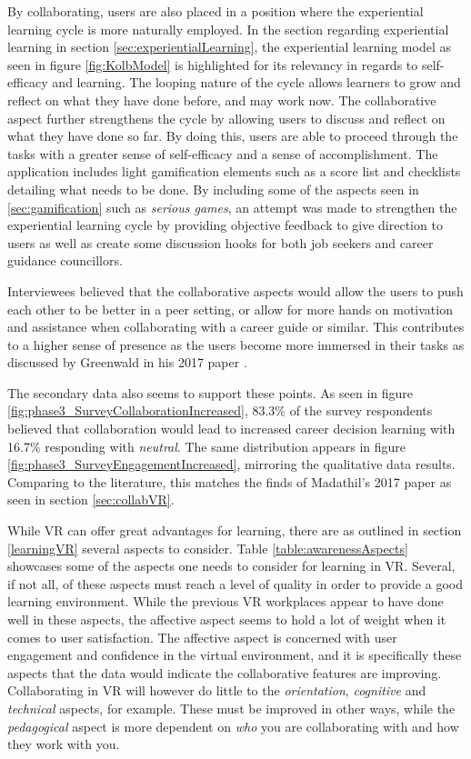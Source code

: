 By collaborating, users are also placed in a position where the experiential learning cycle is more naturally employed. In the section regarding experiential learning in section \ref{sec:experientialLearning}, the experiential learning model as seen in figure \ref{fig:KolbModel} is highlighted for its relevancy in regards to self-efficacy and learning. The looping nature of the cycle allows learners to grow and reflect on what they have done before, and may work now. The collaborative aspect further strengthens the cycle by allowing users to discuss and reflect on what they have done so far.  By doing this, users are able to proceed through the tasks with a greater sense of self-efficacy and a sense of accomplishment. The application includes light gamification elements such as a score list and checklists detailing what needs to be done. By including some of the aspects seen in \ref{sec:gamification} such as \textit{serious games}, an attempt was made to strengthen the experiential learning cycle by providing objective feedback to give direction to users as well as create some discussion hooks for both job seekers and career guidance councillors.

Interviewees believed that the collaborative aspects would allow the users to push each other to be better in a peer setting, or allow for more hands on motivation and assistance when collaborating with a career guide or similar. This contributes to a higher sense of presence as the users become more immersed in their tasks as discussed by Greenwald in his 2017 paper \cite{greenwald2017technology}.


The secondary data also seems to support these points. As seen in figure \ref{fig:phase3_SurveyCollaborationIncreased}, 83.3\% of the survey respondents believed that collaboration would lead to increased career decision learning with 16.7\% responding with \textit{neutral}. The same distribution appears in figure \ref{fig:phase3_SurveyEngagementIncreased}, mirroring the qualitative data results. Comparing to the literature, this matches the finds of Madathil's 2017 paper \cite{madathil2017investigation} as seen in section \ref{sec:collabVR}.

While VR can offer great advantages for learning, there are as outlined in section \ref{learningVR} several aspects to consider. Table \ref{table:awarenessAspects} showcases some of the aspects one needs to consider for learning in VR. Several, if not all, of these aspects must reach a level of quality in order to provide a good learning environment. While the previous VR workplaces appear to have done well in these aspects, the affective aspect seems to hold a lot of weight when it comes to user satisfaction. The affective aspect is concerned with user engagement and confidence in the virtual environment, and it is specifically these aspects that the data would indicate the collaborative features are improving. Collaborating in VR will however do little to the \textit{orientation}, \textit{cognitive} and \textit{technical} aspects, for example. These must be improved in other ways, while the \textit{pedagogical} aspect is more dependent on \textit{who} you are collaborating with and how they work with you.



